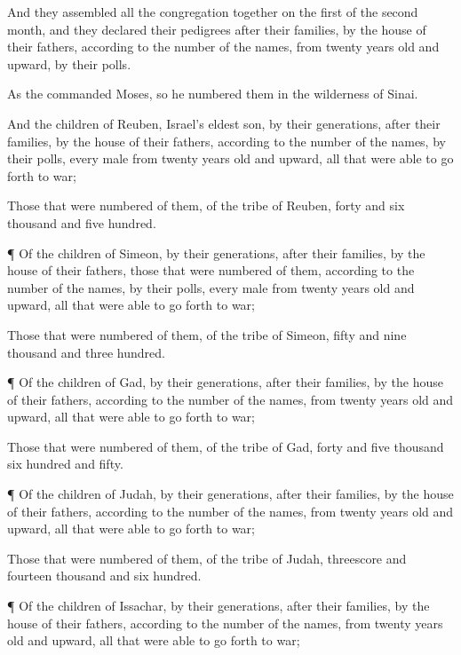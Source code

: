 {And they
assembled all the
congregation
together on the
first
{} of the
second
month, and they declared their
pedigrees after their
families, by the
house of their
fathers, according to the
number of the
names, from
twenty
years
old and
upward, by their
polls.

As the
{}
commanded
Moses, so he
numbered them in the
wilderness of
Sinai.

And the
children of
Reuben,
Israel’s eldest
son, by their
generations, after their
families, by the
house of their
fathers, according to the
number of the
names, by their
polls, every
male from
twenty
years
old and
upward, all that were able to go
forth to
war;

Those that were
numbered of them,
{} of the
tribe of
Reuben,
{}
forty and
six
thousand and
five
hundred.


\par }{\PP {}¶ Of the
children of
Simeon, by their
generations, after their
families, by the
house of their
fathers, those that were
numbered of them, according to the
number of the
names, by their
polls, every
male from
twenty
years
old and
upward, all that were able to go
forth to
war;

Those that were
numbered of them,
{} of the
tribe of
Simeon,
{}
fifty and
nine
thousand and
three
hundred.


\par }{\PP {}¶ Of the
children of
Gad, by their
generations, after their
families, by the
house of their
fathers, according to the
number of the
names, from
twenty
years
old and
upward, all that were able to go
forth to
war;

Those that were
numbered of them,
{} of the
tribe of
Gad,
{}
forty and
five
thousand
six
hundred and
fifty.


\par }{\PP {}¶ Of the
children of
Judah, by their
generations, after their
families, by the
house of their
fathers, according to the
number of the
names, from
twenty
years
old and
upward, all that were able to go
forth to
war;

Those that were
numbered of them,
{} of the
tribe of
Judah,
{} threescore and
fourteen
thousand and
six
hundred.


\par }{\PP {}¶ Of the
children of
Issachar, by their
generations, after their
families, by the
house of their
fathers, according to the
number of the
names, from
twenty
years
old and
upward, all that were able to go
forth to
war;

}
